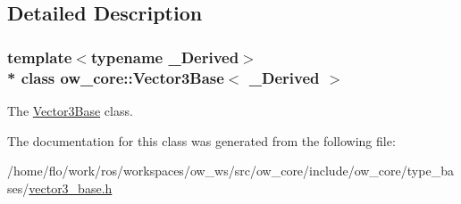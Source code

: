 \subsection{Detailed Description}
\subsubsection*{template$<$typename \+\_\+\+Derived$>$\\*
class ow\+\_\+core\+::\+Vector3\+Base$<$ \+\_\+\+Derived $>$}

The \hyperlink{classow__core_1_1Vector3Base}{Vector3\+Base} class. 

The documentation for this class was generated from the following file\+:\begin{DoxyCompactItemize}
\item 
/home/flo/work/ros/workspaces/ow\+\_\+ws/src/ow\+\_\+core/include/ow\+\_\+core/type\+\_\+bases/\hyperlink{vector3__base_8h}{vector3\+\_\+base.\+h}\end{DoxyCompactItemize}
